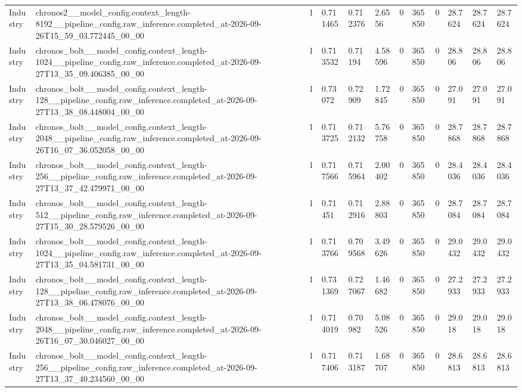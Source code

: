 \begin{tabular}{llllllllllll}
Industry & chronos2\_\_model\_config.context\_length-8192\_\_pipeline\_config.raw\_inference.completed\_at-2026-09-26T15\_59\_03.772445\_00\_00 & 1 & 0.711465 & 0.712376 & 2.6556 & 0 & 365850 & 0 & 28.7624 & 28.7624 & 28.7624 \\
Industry & chronos\_bolt\_\_model\_config.context\_length-1024\_\_pipeline\_config.raw\_inference.completed\_at-2026-09-27T13\_35\_09.406385\_00\_00 & 1 & 0.713532 & 0.71194 & 4.58596 & 0 & 365850 & 0 & 28.806 & 28.806 & 28.806 \\
Industry & chronos\_bolt\_\_model\_config.context\_length-128\_\_pipeline\_config.raw\_inference.completed\_at-2026-09-27T13\_38\_08.448004\_00\_00 & 1 & 0.73072 & 0.72909 & 1.72845 & 0 & 365850 & 0 & 27.091 & 27.091 & 27.091 \\
Industry & chronos\_bolt\_\_model\_config.context\_length-2048\_\_pipeline\_config.raw\_inference.completed\_at-2026-09-26T16\_07\_36.052058\_00\_00 & 1 & 0.713725 & 0.712132 & 5.76758 & 0 & 365850 & 0 & 28.7868 & 28.7868 & 28.7868 \\
Industry & chronos\_bolt\_\_model\_config.context\_length-256\_\_pipeline\_config.raw\_inference.completed\_at-2026-09-27T13\_37\_42.479971\_00\_00 & 1 & 0.717566 & 0.715964 & 2.00402 & 0 & 365850 & 0 & 28.4036 & 28.4036 & 28.4036 \\
Industry & chronos\_bolt\_\_model\_config.context\_length-512\_\_pipeline\_config.raw\_inference.completed\_at-2026-09-27T15\_30\_28.579526\_00\_00 & 1 & 0.71451 & 0.712916 & 2.88803 & 0 & 365850 & 0 & 28.7084 & 28.7084 & 28.7084 \\
Industry & chronos\_bolt\_\_model\_config.context\_length-1024\_\_pipeline\_config.raw\_inference.completed\_at-2026-09-27T13\_35\_04.581731\_00\_00 & 1 & 0.713766 & 0.709568 & 3.49626 & 0 & 365850 & 0 & 29.0432 & 29.0432 & 29.0432 \\
Industry & chronos\_bolt\_\_model\_config.context\_length-128\_\_pipeline\_config.raw\_inference.completed\_at-2026-09-27T13\_38\_06.478076\_00\_00 & 1 & 0.731369 & 0.727067 & 1.46682 & 0 & 365850 & 0 & 27.2933 & 27.2933 & 27.2933 \\
Industry & chronos\_bolt\_\_model\_config.context\_length-2048\_\_pipeline\_config.raw\_inference.completed\_at-2026-09-26T16\_07\_30.046027\_00\_00 & 1 & 0.714019 & 0.70982 & 5.08526 & 0 & 365850 & 0 & 29.018 & 29.018 & 29.018 \\
Industry & chronos\_bolt\_\_model\_config.context\_length-256\_\_pipeline\_config.raw\_inference.completed\_at-2026-09-27T13\_37\_40.234560\_00\_00 & 1 & 0.717406 & 0.713187 & 1.68707 & 0 & 365850 & 0 & 28.6813 & 28.6813 & 28.6813 \\

\end{tabular}
